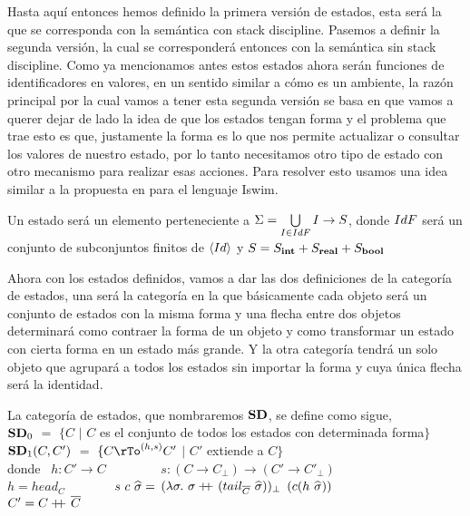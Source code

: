 Hasta aqu\'i entonces hemos definido la primera versi\'on de estados, esta ser\'a la que
se corresponda con la sem\'antica con stack discipline.
Pasemos a definir la segunda versi\'on, la cual se corresponder\'a entonces con
la sem\'antica sin stack discipline. Como ya
mencionamos antes estos estados ahora ser\'an funciones de identificadores
en valores, en un sentido similar a c\'omo es un ambiente, la raz\'on principal
por la cual vamos a tener esta segunda versi\'on se basa en que vamos a querer
dejar de lado la idea de que los estados tengan forma y el problema que 
trae esto es que, justamente la forma es lo que nos permite actualizar o consultar
los valores de nuestro estado, por lo tanto necesitamos otro tipo
de estado con otro mecanismo para realizar esas acciones.
Para resolver esto usamos una idea similar a la propuesta en \cite{reynolds2009theories}
para el lenguaje Iswim.

\begin{definition}\label{algol:states}

Un estado ser\'a un elemento perteneciente a 
$\Sigma = \bigcup\limits_{I \in IdF} I \rightarrow S$, 
donde $IdF$ ser\'a un conjunto de subconjuntos finitos de $\langle Id \rangle$ y
$S = S_{\textbf{int}} + S_{\textbf{real}} + S_{\textbf{bool}}$\\

\end{definition}

Ahora con los estados definidos, vamos a dar las dos definiciones de
la categor\'ia de estados, una ser\'a la categor\'ia en la que b\'asicamente cada objeto ser\'a
un conjunto de estados con la misma forma y una flecha entre dos objetos
determinar\'a como contraer la forma de un objeto y como transformar un estado
con cierta forma en un estado m\'as grande. Y la otra categor\'ia tendr\'a
un solo objeto que agrupar\'a a todos los estados sin importar la forma y
cuya \'unica flecha ser\'a la identidad.

\begin{definition}\label{algol:disciplinestatecategory}
La categor\'ia de estados, que nombraremos $\textbf{SD}$, se define como sigue,\\

\indent
$\textbf{SD}_0$ $=$ $\{C$ $|$ $C$ es el conjunto de todos los estados con determinada forma$\}$\\
\indent
$\textbf{SD}_1(C,C')$ $=$ $\{C \rTo^{(h,s)} C'$ $|$ $C'$ extiende a $C\}$\\

donde \ $h: C' \rightarrow C$
\ \ \ \ \ \ \ \
	  $s: (C \rightarrow C_{\bot}) \rightarrow (C' \rightarrow C'_{\bot})$\\
\indent \indent \indent
	  $h = head_C$
\ \ \ \ \ \ \
	  $s \ c \ \widehat{\sigma} =$ 
	  	   $(\lambda \sigma. \ \sigma +\kern-1.3ex+\kern0.8ex (tail_{\overline{C}} \ \widehat{\sigma}))_{\bot}$
	  	   	$(c(h \ \widehat{\sigma}))$\\
\indent \indent \indent
	 $C' = C +\kern-1.3ex+\kern0.8ex \overline{C}$

\end{definition}

